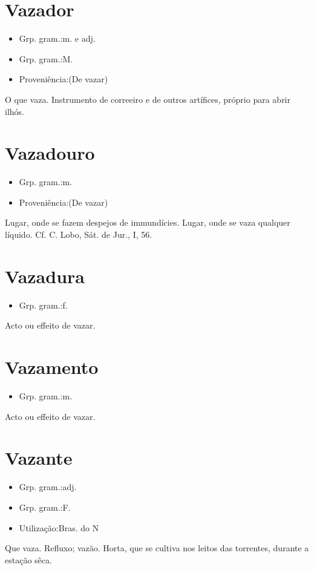 \documentclass{article}
\begin{document}
\section{Vazador}
\begin{itemize}
\item {Grp. gram.:m.  e  adj.}
\end{itemize}
\begin{itemize}
\item {Grp. gram.:M.}
\end{itemize}
\begin{itemize}
\item {Proveniência:(De \textunderscore vazar\textunderscore )}
\end{itemize}
O que vaza.
Instrumento de correeiro e de outros artífices, próprio para abrir ilhós.
\section{Vazadouro}
\begin{itemize}
\item {Grp. gram.:m.}
\end{itemize}
\begin{itemize}
\item {Proveniência:(De \textunderscore vazar\textunderscore )}
\end{itemize}
Lugar, onde se fazem despejos de immundícies.
Lugar, onde se vaza qualquer líquido. Cf. C. Lobo, \textunderscore Sát. de Jur.\textunderscore , I, 56.
\section{Vazadura}
\begin{itemize}
\item {Grp. gram.:f.}
\end{itemize}
Acto ou effeito de vazar.
\section{Vazamento}
\begin{itemize}
\item {Grp. gram.:m.}
\end{itemize}
Acto ou effeito de vazar.
\section{Vazante}
\begin{itemize}
\item {Grp. gram.:adj.}
\end{itemize}
\begin{itemize}
\item {Grp. gram.:F.}
\end{itemize}
\begin{itemize}
\item {Utilização:Bras. do N}
\end{itemize}
Que vaza.
Refluxo; vazão.
Horta, que se cultiva nos leitos das torrentes, durante a estação sêca.
\end{document}
